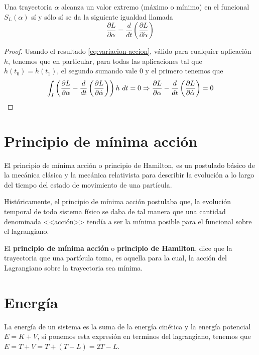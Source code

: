 \begin{theorem}
    Una trayectoria $\alpha$ alcanza un valor extremo (máximo o mínimo) en el funcional $S_L(\alpha)$ sí y sólo sí se da la siguiente igualdad llamada 
    \begin{equation}
        \label{eq:euler-lagrange}
        \frac{\partial L}{\partial \alpha}=\frac{d}{dt}\left( \frac{\partial L}{\partial \dot{\alpha}} \right)
    \end{equation}
\end{theorem}
\begin{proof}
    Usando el resultado \ref{eq:variacion-accion}, válido para cualquier aplicación $h$, tenemos que en particular, para todas las aplicaciones tal que $h(t_0)=h(t_1)$, el segundo sumando vale $0$ y el primero tenemos que
    \begin{equation*}
        \int_{I}\left( \frac{\partial L}{\partial \alpha}-\frac{d}{dt}\left( \frac{\partial L}{\partial \dot{\alpha}} \right)\right)h\ dt = 0 \Rightarrow \frac{\partial L}{\partial \alpha}-\frac{d}{dt}\left( \frac{\partial L}{\partial \dot{\alpha}} \right) = 0
    \end{equation*}
\end{proof}

\section{Principio de mínima acción}

El principio de mínima acción o principio de Hamilton, es un postulado básico de la mecánica clásica y la mecánica relativista para describir la evolución a lo largo del tiempo del estado de movimiento de una partícula.

Históricamente, el principio de mínima acción postulaba que, la evolución temporal de todo sistema físico se daba de tal manera que una cantidad denominada <<acción>> tendía a ser la mínima posible para el funcional sobre el lagrangiano.

El \textbf{principio de mínima acción} o \textbf{principio de Hamilton}, dice que la trayectoria que una partícula toma, es aquella para la cual, la acción del Lagrangiano sobre la trayectoria sea mínima.

\section{Energía}
La energía de un sistema es la suma de la energía cinética y la energía potencial $E=K+V$, si ponemos esta expresión en terminos del lagrangiano, tenemos que $E=T+V=T+(T-L)=2T-L$.

